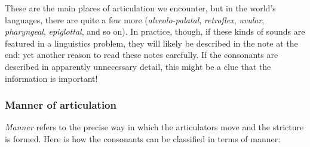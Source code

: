 \begin{refsection}
These are the main places of articulation we encounter, but in the world's languages, there are quite a few more (\textit{alveolo-palatal}, \textit{retroflex}, \textit{uvular}, \textit{pharyngeal}, \textit{epiglottal}, and so on). In practice, though, if these kinds of sounds are featured in a linguistics problem, they will likely be described in the note at the end: yet another reason to read these notes carefully. If the consonants are described in apparently unnecessary detail, this might be a clue that the information is important!

\subsubsection{Manner of articulation}

\textit{Manner} refers to the precise way in which the articulators move and the stricture is formed. Here is how the consonants can be classified in terms of manner:


\end{refsection}
